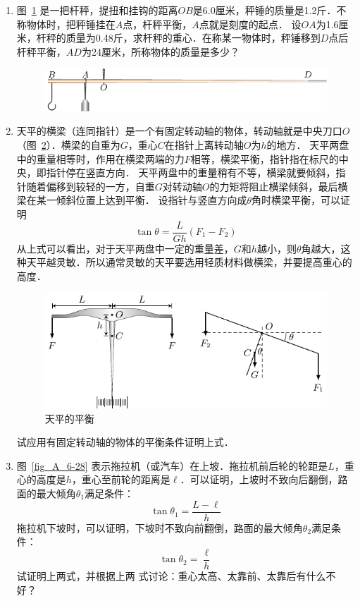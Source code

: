 \begin{enumerate}
\item  图~\ref{fig_A_6-26} 是一把杆秤，提扭和挂钩的距离$OB$是6.0厘米，秤锤的质量是1.2斤．不称物体时，把秤锤挂在$A$点，杆秤平衡，$A$点就是刻度的起点．
设$OA$为1.6厘米，杆秤的质量为0.48斤，求杆秤的重心．在称某一物体时，秤锤移到$D$点后杆秤平衡，$AD$为24厘米，所称物体的质量是多少？
\begin{figure}[htbp]
    \centering
    \includegraphics{fig/A/6-26.pdf}
    \caption{}\label{fig_A_6-26}
\end{figure}
\item 天平的横梁（连同指针）是一个有固定转动轴的物体，转动轴就是中央刀口$O$（图~\ref{fig_A_6-27}）．横梁的自重为$G$，重心$C$在指针上离转动轴$O$为$h$的地方．
天平两盘中的重量相等时，作用在横梁两端的力$F$相等，横梁平衡，指针指在标尺的中央，即指针停在竖直方向．
天平两盘中的重量稍有不等，横梁就要倾斜，指针随着偏移到较轻的一方，自重$G$对转动轴$O$的力矩将阻止横梁倾斜，最后横梁在某一倾斜位置上达到平衡．
设指针与竖直方向成$\theta$角时横梁平衡，可以证明
\[\tan\theta =\frac{L}{Gh}(F_1-F_2) \]
从上式可以看出，对于天平两盘中一定的重量差，$G$和$h$越小，则$\theta$角越大，这种天平越灵敏．所以通常灵敏的天平要选用轻质材料做横梁，并要提高重心的高度．
\begin{figure}[htbp]
    \centering
    \includegraphics{fig/A/6-27.pdf}
    \caption{天平的平衡}\label{fig_A_6-27}
\end{figure}
试应用有固定转动轴的物体的平衡条件证明上式．

\item  图~\ref{fig_A_6-28} 表示拖拉机（或汽车）在上坡．拖拉机前后轮的轮距是$L$，重心的高度是$h$，重心至前轮的距离是$\ell$．可以证明，上坡时不致向后翻倒，路面的最大倾角$\theta_1$满足条件：
\[\tan\theta_1=\frac{L-\ell}{h}\]
拖拉机下坡时，可以证明，下坡时不致向前翻倒，路面的最大倾角$\theta_2$满足条件：
\[\tan\theta_2=\frac{\ell}{h}\]
试证明上两式，并根据上两
式讨论：重心太高、太靠前、太靠后有什么不好？



\end{enumerate}

